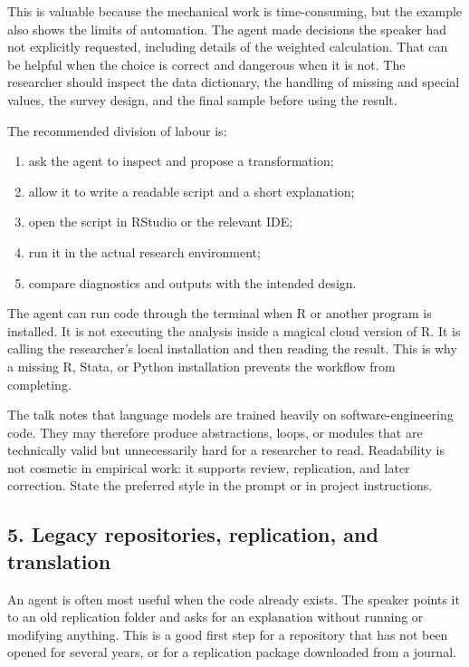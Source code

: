 \documentclass[
  english,
  10pt,
]{article}
\providecommand{\tightlist}{%
  \setlength{\itemsep}{0pt}\setlength{\parskip}{0pt}}
\begin{document}
This is valuable because the mechanical work is time-consuming, but the
example also shows the limits of automation. The agent made decisions
the speaker had not explicitly requested, including details of the
weighted calculation. That can be helpful when the choice is correct and
dangerous when it is not. The researcher should inspect the data
dictionary, the handling of missing and special values, the survey
design, and the final sample before using the result.

The recommended division of labour is:

\begin{enumerate}
\def\labelenumi{\arabic{enumi}.}
\tightlist
\item
  ask the agent to inspect and propose a transformation;
\item
  allow it to write a readable script and a short explanation;
\item
  open the script in RStudio or the relevant IDE;
\item
  run it in the actual research environment;
\item
  compare diagnostics and outputs with the intended design.
\end{enumerate}

The agent can run code through the terminal when R or another program is
installed. It is not executing the analysis inside a magical cloud
version of R. It is calling the researcher's local installation and then
reading the result. This is why a missing R, Stata, or Python
installation prevents the workflow from completing.

The talk notes that language models are trained heavily on
software-engineering code. They may therefore produce abstractions,
loops, or modules that are technically valid but unnecessarily hard for
a researcher to read. Readability is not cosmetic in empirical work: it
supports review, replication, and later correction. State the preferred
style in the prompt or in project instructions.

\subsection{5. Legacy repositories, replication, and
translation}\label{legacy-repositories-replication-and-translation}

An agent is often most useful when the code already exists. The speaker
points it to an old replication folder and asks for an explanation
without running or modifying anything. This is a good first step for a
repository that has not been opened for several years, or for a
replication package downloaded from a journal.
\end{document}
